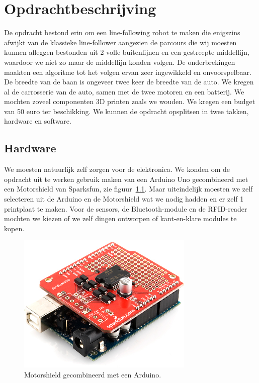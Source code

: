 \chapter{Opdrachtbeschrijving}
\label{chap:Opdrachtbeschrijving}
De opdracht bestond erin om een line-following robot te maken die enigszins afwijkt van de klassieke line-follower aangezien de parcours die wij moesten kunnen afleggen bestonden uit 2 volle buitenlijnen en een gestreepte middellijn, waardoor we niet zo maar de middellijn konden volgen. De onderbrekingen maakten een algoritme tot het volgen ervan zeer ingewikkeld en onvoorspelbaar. De breedte van de baan is ongeveer twee keer de breedte van de auto. We kregen al de carrosserie van de auto, samen met de twee motoren en een batterij. We mochten zoveel componenten 3D printen zoals we wouden. We kregen een budget van 50 euro ter beschikking. We kunnen de opdracht opsplitsen in twee takken, hardware en software.
\section{Hardware}
We moesten natuurlijk zelf zorgen voor de elektronica. We konden om de opdracht uit te werken gebruik maken van een Arduino Uno gecombineerd met een Motorshield van Sparksfun, zie figuur~\ref{fig:ArduMoto}. Maar uiteindelijk moesten we zelf selecteren uit de Arduino en de Motorshield wat we nodig hadden en er zelf 1 printplaat te maken. Voor de sensors, de Bluetooth-module en de RFID-reader mochten we kiezen of we zelf dingen ontworpen of kant-en-klare modules te kopen.
\begin{figure}[h]
\centering
\includegraphics[width=0.75\textwidth]{ArduMoto.png}
\caption{Motorshield gecombineerd met een Arduino. \label{fig:ArduMoto}}
\end{figure}

